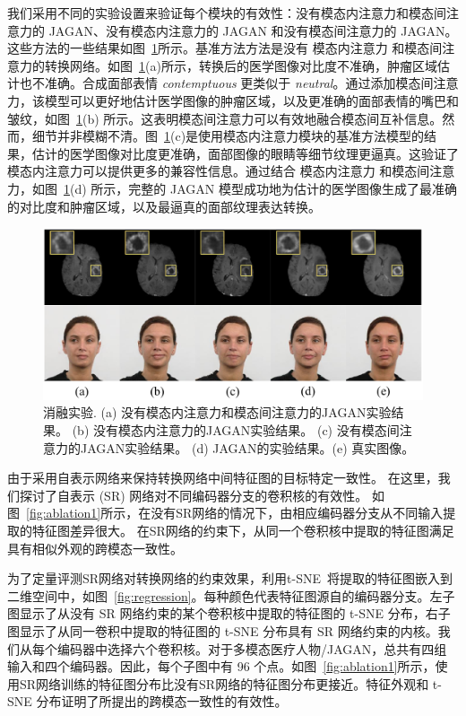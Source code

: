 我们采用不同的实验设置来验证每个模块的有效性：没有模态内注意力和模态间注意力的 JAGAN、没有模态内注意力的 JAGAN 和没有模态间注意力的 JAGAN。这些方法的一些结果如图~\ref{fig:ablation}所示。基准方法方法是没有 模态内注意力 和模态间注意力的转换网络。如图~\ref{fig:ablation}(a)所示，转换后的医学图像对比度不准确，肿瘤区域估计也不准确。合成面部表情 \textit{contemptuous} 更类似于 \textit{neutral}。通过添加模态间注意力，该模型可以更好地估计医学图像的肿瘤区域，以及更准确的面部表情的嘴巴和皱纹，如图~\ref{fig:ablation}(b) 所示。这表明模态间注意力可以有效地融合模态间互补信息。然而，细节并非模糊不清。图~\ref{fig:ablation}(c)是使用模态内注意力模块的基准方法模型的结果，估计的医学图像对比度更准确，面部图像的眼睛等细节纹理更逼真。这验证了模态内注意力可以提供更多的兼容性信息。通过结合 模态内注意力 和模态间注意力，如图~\ref{fig:ablation}(d) 所示，完整的 JAGAN 模型成功地为估计的医学图像生成了最准确的对比度和肿瘤区域，以及最逼真的面部纹理表达转换。

\begin{figure}
	\begin{center}
		\includegraphics[width=0.8\columnwidth]{figures/JAGAN/ablation.pdf}
	\end{center}
	\caption{消融实验. (a) 没有模态内注意力和模态间注意力的JAGAN实验结果。 (b) 没有模态内注意力的JAGAN实验结果。 (c) 没有模态间注意力的JAGAN实验结果。 (d) JAGAN的实验结果。(e) 真实图像。}
	\label{fig:ablation}
\end{figure}

由于采用自表示网络来保持转换网络中间特征图的目标特定一致性。 在这里，我们探讨了自表示 (SR) 网络对不同编码器分支的卷积核的有效性。 如图~\ref{fig:ablation1}所示，在没有SR网络的情况下，由相应编码器分支从不同输入提取的特征图差异很大。 在SR网络的约束下，从同一个卷积核中提取的特征图满足具有相似外观的跨模态一致性。

为了定量评测SR网络对转换网络的约束效果，利用t-SNE~\cite{maaten2008visualizing}将提取的特征图嵌入到二维空间中，如图~\ref{fig:regression}。每种颜色代表特征图源自的编码器分支。左子图显示了从没有 SR 网络约束的某个卷积核中提取的特征图的 t-SNE 分布，右子图显示了从同一卷积中提取的特征图的 t-SNE 分布具有 SR 网络约束的内核。我们从每个编码器中选择六个卷积核。对于多模态医疗人物/JAGAN，总共有四组输入和四个编码器。因此，每个子图中有 96 个点。如图~\ref{fig:ablation1}所示，使用SR网络训练的特征图分布比没有SR网络的特征图分布更接近。特征外观和 t-SNE 分布证明了所提出的跨模态一致性的有效性。

